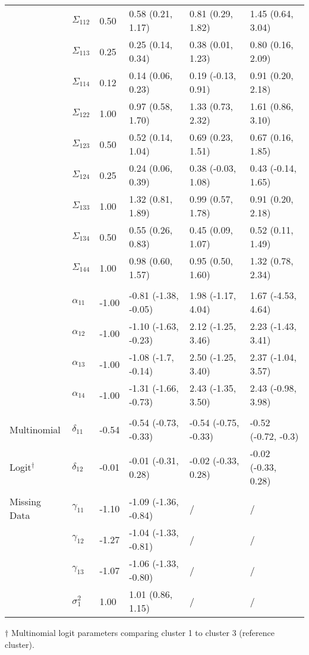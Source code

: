 \documentclass[useAMS,usenatbib,referee]{biom}
\begin{document}
\begin{table}[t]
\begin{center}
\begin{tabular}{llllll}
& $\Sigma_{112}$ & 0.50 & 0.58 (0.21, 1.17) & 0.81 (0.29, 1.82) & 1.45 (0.64, 3.04)\\
& $\Sigma_{113}$ & 0.25 & 0.25 (0.14, 0.34) & 0.38 (0.01, 1.23) & 0.80 (0.16, 2.09)\\
& $\Sigma_{114}$ & 0.12 & 0.14 (0.06, 0.23) & 0.19 (-0.13, 0.91) & 0.91 (0.20, 2.18)\\
& $\Sigma_{122}$ & 1.00 & 0.97 (0.58, 1.70) & 1.33 (0.73, 2.32) & 1.61 (0.86, 3.10)\\
& $\Sigma_{123}$ & 0.50 & 0.52 (0.14, 1.04) & 0.69 (0.23, 1.51) & 0.67 (0.16, 1.85)\\
& $\Sigma_{124}$ & 0.25 & 0.24 (0.06, 0.39) & 0.38 (-0.03, 1.08) & 0.43 (-0.14, 1.65)\\
& $\Sigma_{133}$ & 1.00 & 1.32 (0.81, 1.89) & 0.99 (0.57, 1.78) & 0.91 (0.20, 2.18)\\
& $\Sigma_{134}$ & 0.50 & 0.55 (0.26, 0.83) & 0.45 (0.09, 1.07) & 0.52 (0.11, 1.49)\\
& $\Sigma_{144}$ & 1.00 & 0.98 (0.60, 1.57) & 0.95 (0.50, 1.60) & 1.32 (0.78, 2.34)\\
\addlinespace[0.2em]
\multicolumn{5}{l}{\textbf{ }}\\
& $\alpha_{11}$ & -1.00 & -0.81 (-1.38, -0.05) & 1.98 (-1.17, 4.04) & 1.67 (-4.53, 4.64)\\
& $\alpha_{12}$ & -1.00 & -1.10 (-1.63, -0.23) & 2.12 (-1.25, 3.46) & 2.23 (-1.43, 3.41)\\
& $\alpha_{13}$ & -1.00 & -1.08 (-1.7, -0.14) & 2.50 (-1.25, 3.40) & 2.37 (-1.04, 3.57)\\
& $\alpha_{14}$ & -1.00 & -1.31 (-1.66, -0.73) & 2.43 (-1.35, 3.50) & 2.43 (-0.98, 3.98)\\
\addlinespace[0.2em]
\multicolumn{5}{l}{\textbf{ }}\\
Multinomial & $\delta_{11}$ & -0.54 & -0.54 (-0.73, -0.33) & -0.54 (-0.75, -0.33) & -0.52 (-0.72, -0.3)\\
Logit$^{\dagger}$ & $\delta_{12}$ & -0.01 & -0.01 (-0.31, 0.28) & -0.02 (-0.33, 0.28) & -0.02 (-0.33, 0.28)\\
\addlinespace[0.2em]
\multicolumn{5}{l}{\textbf{ }}\\
Missing Data & $\gamma_{11}$ & -1.10 & -1.09 (-1.36, -0.84) &  / & / \\
& $\gamma_{12}$ & -1.27 & -1.04 (-1.33, -0.81) & / & / \\
& $\gamma_{13}$ & -1.07 & -1.06 (-1.33, -0.80)& / & / \\
& $\sigma^2_{1}$ & 1.00 & 1.01 (0.86, 1.15) & / & / \\
\bottomrule
\end{tabular}\vspace{.75cm}
\end{center}
$\dagger$ Multinomial logit parameters comparing cluster 1 to cluster 3 (reference cluster).
\end{table}
\end{document}
